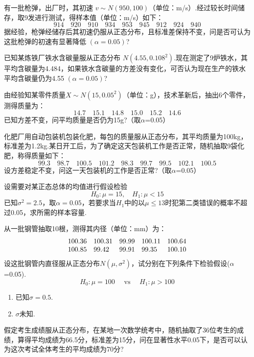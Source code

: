 \begin{xiti}
	\item 有一批枪弹，出厂时，其初速 $v\sim N(950,100)$（单位：m/s）.经过较长时间储存，取9发进行测试，得样本值（单位：m/s）如下：
	\[914 \quad 920 \quad 910 \quad 934 \quad 953 \quad 945 \quad 912 \quad 924 \quad 940\]
	据经验，枪弹经储存后其初速仍服从正态分布，且标准差保持不变，问是否可认为这批枪弹的初速有显著降低 $(\alpha=0.05)$?
		
	\item 已知某炼铁厂铁水含碳量服从正态分布 $N(4.55,0.108^{{2}})$.现在测定了9炉铁水，其平均含碳量为4.484，如果铁水含碳量的方差没有变化，可否认为现在生产的铁水平均含碳量仍为4.55 $(\alpha=0.05)$?
	
	
	\item 由经验知某零件质量$X \sim N \left( 15,0.05 ^ { 2 } \right)$（单位：g），技术革新后，抽出6个零件，测得质量为：
	\[14.7 \quad 15.1 \quad 14.8 \quad 15.0 \quad 15.2 \quad 14.6\]
	已知方差不变，问平均质量是否仍为15g?（取$\alpha$=0.05）
	
	
	\item 化肥厂用自动包装机包装化肥，每包的质量服从正态分布，其平均质量为100kg，标准差为1.2kg.某日开工后，为了确定这天包装机工作是否正常，随机抽取9袋化肥，称得质量如下：
	\[99.3 \quad 98.7 \quad 100.5 \quad 101.2 \quad 98.3 \quad 99.7 \quad 99.5 \quad 102.1 \quad 100.5\]
	设方差稳定不变，问这一天包装机的工作是否正常?（取$\alpha$=0.05）
	
	
	\item 设需要对某正态总体的均值进行假设检验
	\[H _ { 0 } : \mu = 15 , \quad H _ { 1 } : \mu < 15\]
	已知$\sigma^{2}=2.5$，取$\alpha=0.05$，若要求当$H_{1}$中的以$\mu \leq 13$时犯第二类错误的概率不超过0.05，求所需的样本容量.
	
	
	\item 从一批钢管抽取10根，测得其内径（单位：mm）为：
	\[\begin{array} { l l l l l } { 100.36 } & { 100.31 } & { 99.99 } & { 100.11 } & { 100.64 } \\ { 100.85 } & { 99.42 } & { 99.91 } & { 99.35 } & { 100.10 } \end{array}\]
	设这批钢管内直径服从正态分布$N(\mu ,\sigma^{2})$，试分别在下列条件下检验假设($\alpha$=0.05).
	\[H _ { 0 } : \mu = 100 \quad \text { vs } \quad H _ { 1 } : \mu > 100\]
	\begin{enumerate}
		\item 已知$\sigma=0.5$.
		\item $\sigma$未知.
	\end{enumerate}
	\item 假定考生成绩服从正态分布，在某地一次数学统考中，随机抽取了36位考生的成绩，算得平均成绩为66.5分，标准差为15分，问在显著性水平0.05下，是否可以认为这次考试全体考生的平均成绩为70分?
	

\end{xiti}

